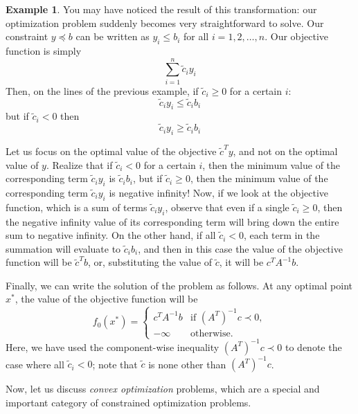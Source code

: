 \documentclass[a4paper]{article}
\theoremstyle{definition}
\newtheorem{example}{Example}[section]
\begin{document}
\begin{example}
	You may have noticed the result of this transformation: our optimization problem suddenly becomes very straightforward to solve.
	Our constraint $y \preceq b$ can be written as $y_i \leq b_i$ for all $i = 1, 2, \dots, n$.
	Our objective function is simply
	\begin{equation*}
		\sum_{i=1}^n \tilde{c}_i y_i
	\end{equation*}
	Then, on the lines of the previous example, if $\tilde{c}_i \geq 0$ for a certain $i$:
	\begin{equation*}
		\tilde{c}_i y_i \leq \tilde{c}_i b_i
	\end{equation*}
	but if $\tilde{c}_i < 0$ then
	\begin{equation*}
		\tilde{c}_i y_i \geq \tilde{c}_i b_i
	\end{equation*}

	Let us focus on the optimal value of the objective $\tilde{c}^T y$, and not on the optimal value of $y$.
	Realize that if $\tilde{c}_i < 0$ for a certain $i$, then the minimum value of the corresponding term $\tilde{c}_i y_i$ is $\tilde{c}_i b_i$, but if $\tilde{c}_i \geq 0$, then the minimum value of the corresponding term $\tilde{c}_i y_i$ is negative infinity!
	Now, if we look at the objective function, which is a sum of terms $\tilde{c}_i y_i$, observe that even if a single $\tilde{c}_i \geq 0$, then the negative infinity value of its corresponding term will bring down the entire sum to negative infinity.
	On the other hand, if all $\tilde{c}_i < 0$, each term in the summation will evaluate to $\tilde{c}_i b_i$, and then in this case the value of the objective function will be $\tilde{c}^T b$, or, substituting the value of $\tilde{c}$, it will be $c^T A^{-1} b$.

	Finally, we can write the solution of the problem as follows.
	At any optimal point $x^*$, the value of the objective function will be
	\begin{equation*}
		f_0(x^*) = \begin{cases}
			c^T A^{-1} b & \text{if } (A^T)^{-1} c \prec 0, \\
			-\infty & \text{otherwise.}
		\end{cases}
	\end{equation*}
	Here, we have used the component-wise inequality $(A^T)^{-1} c \prec 0$ to denote the case where all $\tilde{c}_i < 0$; note that $\tilde{c}$ is none other than $(A^T)^{-1} c$.
\end{example}

Now, let us discuss \textit{convex optimization} problems, which are a special and important category of constrained optimization problems.
\end{document}
